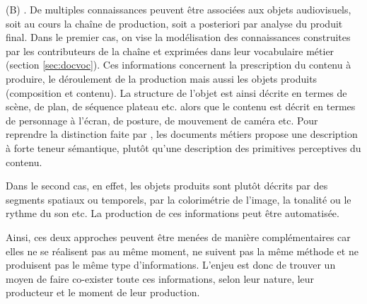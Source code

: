\begin{liste}
	\item[(B)] .
	De multiples connaissances peuvent être associées aux objets audiovisuels, soit au cours la chaîne de production, soit a posteriori par analyse du produit final.
	Dans le premier cas, on vise la modélisation des connaissances construites par les contributeurs de la chaîne et exprimées dans leur vocabulaire métier (section \ref{sec:docvoc}). 
	Ces informations concernent la prescription du contenu à produire, le déroulement de la production mais aussi les objets produits (composition et contenu).
	La structure de l'objet est ainsi décrite en termes de scène, de plan, de séquence plateau etc. alors que le contenu est décrit en termes de personnage à l'écran, de posture, de mouvement de caméra etc. 
	Pour reprendre la distinction faite par \cite[\S 3.3.2.1 Descriptions du contenu, p.83]{ThiBui2003}, les documents métiers propose une description à forte teneur sémantique, plutôt qu'une description des primitives perceptives du contenu.
	
	Dans le second cas, en effet, les objets produits sont plutôt décrits par des segments spatiaux ou temporels, par la colorimétrie de l'image, la tonalité ou le rythme du son etc. 
	La production de ces informations peut être automatisée. 
	
	Ainsi, ces deux approches peuvent être menées de manière complémentaires car elles ne se réalisent pas au même moment, ne suivent pas la même méthode et ne produisent pas le même type d'informations.
	L'enjeu est donc de trouver un moyen de faire co-exister toute ces informations, selon leur nature, leur producteur et le moment de leur production.
\end{liste}




